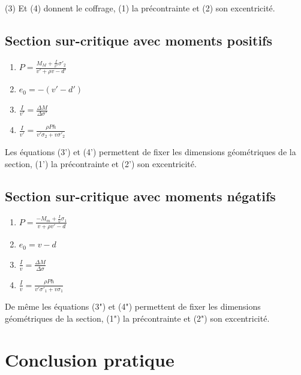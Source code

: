\documentclass[12pt,a4paper]{article}
\begin{document}
(3) Et (4) donnent le coffrage, (1) la précontrainte et (2) son excentricité.

\subsection{Section sur-critique avec moments positifs}

\begin{enumerate}
    \item[$1'.$] $P = \frac{M_M + \frac{I}{v'}\sigma'_2}{v' + \rho v - d'}$
    \item[$2'.$] $e_0 = -(v' - d')$
    \item[$3'.$] $\frac{I}{v'} = \frac{\Delta M}{\Delta \sigma'}$
    \item[$4'.$] $\frac{I}{v'} = \frac{\rho Ph}{v'\sigma_2 + v\sigma'_2}$
\end{enumerate}

Les équations (3') et (4') permettent de fixer les dimensions géométriques de la section, (1') la précontrainte et (2') son excentricité.

\subsection{Section sur-critique avec moments négatifs}

\begin{enumerate}
    \item[$1''. $] $P = \frac{-M_m + \frac{I}{v}\sigma_1}{v + \rho v' - d}$
    \item[$2''. $] $e_0 = v - d$
    \item[$3''. $] $\frac{I}{v} = \frac{\Delta M}{\Delta \sigma}$
    \item[$4''. $] $\frac{I}{v} = \frac{\rho Ph}{v'\sigma'_1 + v\sigma_1}$
\end{enumerate}

De même les équations (3") et (4") permettent de fixer les dimensions géométriques de la section, (1") la précontrainte et (2") son excentricité.

\section{Conclusion pratique}
\end{document}
